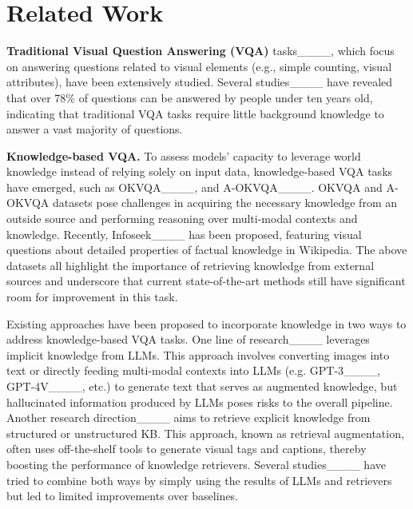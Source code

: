 \section{Related Work}
\textbf{Traditional Visual Question Answering (VQA)} tasks____, which focus on answering questions related to visual elements (e.g., simple counting, visual attributes), have been extensively studied. 
Several studies____ have revealed that over 78\% of questions can be answered by people under ten years old, indicating that traditional VQA tasks require little background knowledge to answer a vast majority of questions.


\noindent \textbf{Knowledge-based VQA.} To assess models' capacity to leverage world knowledge instead of relying solely on input data, knowledge-based VQA tasks have emerged, such as OKVQA____, and A-OKVQA____. 
OKVQA and A-OKVQA datasets pose challenges in acquiring the necessary knowledge from an outside source and performing reasoning over multi-modal contexts and knowledge. 
Recently, Infoseek____ has been proposed, featuring visual questions about detailed properties of factual knowledge in Wikipedia. The above datasets all highlight the importance of retrieving knowledge from external sources and underscore that current state-of-the-art methods still have significant room for improvement in this task.

Existing approaches have been proposed to incorporate knowledge in two ways to address knowledge-based VQA tasks.
One line of research____ leverages implicit knowledge from LLMs.
This approach involves converting images into text or directly feeding multi-modal contexts into LLMs (e.g. GPT-3____, GPT-4V____, etc.) to generate text that serves as augmented knowledge, but hallucinated information produced by LLMs poses risks to the overall pipeline. 
Another research direction____ aims to retrieve explicit knowledge from structured or unstructured KB.
This approach, known as retrieval augmentation, often uses off-the-shelf tools to generate visual tags and captions, thereby boosting the performance of knowledge retrievers.
Several studies____ have tried to combine both ways by simply using the results of LLMs and retrievers but led to limited improvements over baselines.

